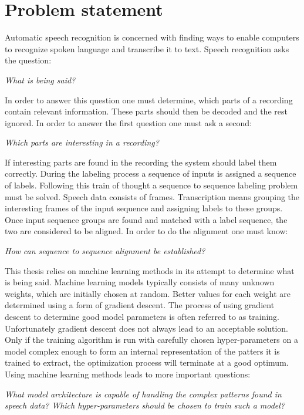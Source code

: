 \chapter{Problem statement}
\label{cha:problemStatement}
Automatic speech recognition is concerned with finding ways to enable computers to recognize spoken language and transcribe it to text. Speech recognition asks the question: 

\noindent \textit{What is being said?}

In order to answer this question one must determine, which parts of a recording contain relevant information. These parts should then be decoded and the rest ignored. In order to answer the first question one must ask a second: 

\noindent \textit{Which parts are interesting in a recording?}

If interesting parts are found in the recording the system should label them correctly. During the labeling process a sequence of inputs is assigned a sequence of labels. Following this train of thought a sequence to sequence labeling problem must be solved. Speech data consists of frames. Transcription means grouping the interesting frames of the input sequence and assigning labels to these groups. Once input sequence groups are found and matched with a label sequence, the two are considered to be aligned. In order to do the alignment one must know: 

\noindent \textit{How can sequence to sequence alignment be established?} 

This thesis relies on machine learning methods in its attempt to determine what is being said. Machine learning models typically consists of many unknown weights, which are initially chosen at random. Better values for each weight are determined using a form of gradient descent. The process of using gradient descent to determine good model parameters is often referred to as training. Unfortunately gradient descent does not always lead to an acceptable solution. Only if the training algorithm is run with carefully chosen hyper-parameters on a model complex enough to form an internal representation of the patters it is trained to extract, the optimization process will terminate at a good optimum. Using machine learning methods leads to more important questions: 

\noindent \textit{What model architecture is capable of handling the complex patterns found in speech data?}
\textit{Which hyper-parameters should be chosen to train such a model?}

